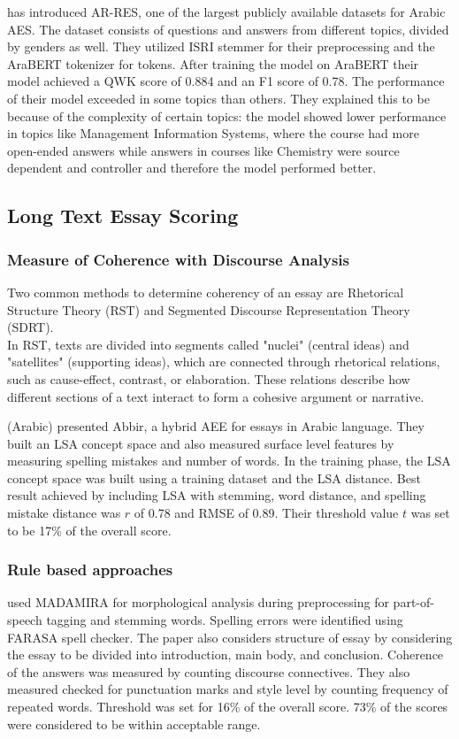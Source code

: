 \documentclass{article}
\begin{document}
	
	\textbf{\textcite{23_ghazawi2024bert}} has introduced AR-RES, one of the largest publicly available datasets for Arabic AES. The dataset consists of questions and answers from different topics, divided by genders as well. They utilized ISRI stemmer for their preprocessing and the AraBERT tokenizer for tokens. After training the model on AraBERT their model achieved a QWK score of 0.884 and an F1 score of 0.78. The performance of their model exceeded in some topics than others. They explained this to be because of the complexity of certain topics: the model showed lower performance in topics like Management Information Systems, where the course had more open-ended answers while answers in courses like Chemistry were source dependent and controller and therefore the model performed better. 
	
	\subsection{Long Text Essay Scoring}
	\subsubsection*{Measure of Coherence with Discourse Analysis}
	Two common methods to determine coherency of an essay are Rhetorical Structure Theory (RST) and Segmented Discourse Representation Theory (SDRT). \\ In RST, texts are divided into segments called "nuclei" (central ideas) and "satellites" (supporting ideas), which are connected through rhetorical relations, such as cause-effect, contrast, or elaboration. These relations describe how different sections of a text interact to form a cohesive argument or narrative. 
	
	\textbf{\textcite{6_ghamdi2014hybridarabic}} (Arabic) presented Abbir, a hybrid AEE for essays in Arabic language. They built an LSA concept space and also measured surface level features by measuring spelling mistakes and number of words. In the training phase, the LSA concept space was built using a training dataset and the LSA distance. Best result achieved by including LSA with stemming, word distance, and spelling mistake distance was $r$ of 0.78 and RMSE of 0.89. Their threshold value $t$ was set to be 17\% of the overall score. 
	
	\subsubsection*{Rule based approaches}
	\textbf{\textcite{7_qahtani2019rulebased}} used MADAMIRA \cite{pasha2014madamira} for morphological analysis during preprocessing for part-of-speech tagging and stemming words. Spelling errors were identified using FARASA spell checker. The paper also considers structure of essay by considering the essay to be divided into introduction, main body, and conclusion. Coherence of the answers was measured by counting discourse connectives. They also measured checked for punctuation marks and style level by counting frequency of repeated words. Threshold was set for 16\% of the overall score. 73\% of the scores were considered to be within acceptable range.
	
\end{document}
